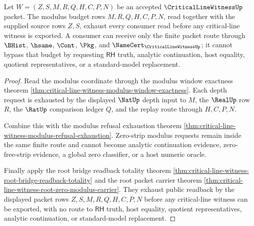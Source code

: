 \begin{theorem}
\label{thm:critical-line-witness-modulus-budget-totality}
Let $W=(Z,S,M,R,Q,H,C,P,N)$ be an accepted $\CriticalLineWitnessUp$ packet.
The modulus budget rows $M,R,Q,H,C,P,N$, read together with the supplied
source rows $Z,S$, exhaust every consumer read before any critical-line
witness is exported. A consumer can receive only the finite packet route
through $\BHist$, $\hsame$, $\Cont$, $\Pkg$, and
$\NameCert_{\CriticalLineWitnessUp}$; it cannot bypass that budget by
requesting $\mathsf{RH}$ truth, analytic continuation, host equality,
quotient representatives, or a standard-model replacement.
\end{theorem}
\begin{proof}
Read the modulus coordinate through the modulus window exactness theorem
\autoref{thm:critical-line-witness-modulus-window-exactness}. Each depth
request is exhausted by the displayed $\NatUp$ depth input to $M$, the
$\RealUp$ row $R$, the $\RatUp$ comparison ledger $Q$, and the replay route
through $H,C,P,N$.

Combine this with the modulus refusal exhaustion theorem
\autoref{thm:critical-line-witness-modulus-refusal-exhaustion}. Zero-strip
modulus requests remain inside the same finite route and cannot become
analytic continuation evidence, zero-free-strip evidence, a global zero
classifier, or a host numeric oracle.

Finally apply the root bridge readback totality theorem
\autoref{thm:critical-line-witness-root-bridge-readback-totality} and the
root packet carrier theorem
\autoref{thm:critical-line-witness-root-zero-modulus-carrier}. They exhaust
public readback by the displayed packet rows $Z,S,M,R,Q,H,C,P,N$ before any
critical-line witness can be exported, with no route to $\mathsf{RH}$ truth,
host equality, quotient representatives, analytic continuation, or
standard-model replacement.
\end{proof}
